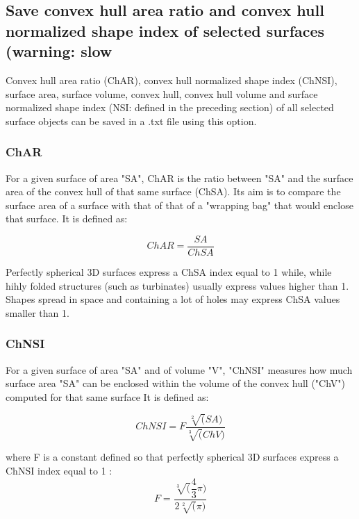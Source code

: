 \subsection{Save convex hull area ratio and convex hull normalized shape index of selected surfaces (warning: slow}
\noindent
Convex hull area ratio (ChAR), convex hull normalized shape index (ChNSI), surface area, surface volume, convex hull, convex hull volume and surface normalized shape index (NSI: defined in the preceding section) of all selected surface objects can be saved in a .txt file using this option.\\

\subsubsection{ChAR}

\noindent For a given surface of area "SA", ChAR is the ratio between "SA" and the surface area of the convex hull of that same surface (ChSA). Its aim is to compare the surface area of a surface with that of that of a "wrapping bag" that would enclose that surface. It is defined as: 


\begin{equation}
ChAR = \dfrac{SA}{ChSA}
\end{equation}

\noindent Perfectly spherical 3D surfaces express a ChSA index equal to 1 while, while hihly folded structures (such as turbinates)  usually express values higher than 1. Shapes spread in space and containing a lot of holes may express ChSA values smaller than 1.

\subsubsection{ChNSI}
\noindent For a given surface of area "SA" and of volume "V", "ChNSI" measures how much surface area "SA" can be enclosed within the volume of the convex hull ("ChV") computed for that same surface It is defined as: 

\begin{equation}
ChNSI = F \dfrac{\sqrt[2](SA)}{\sqrt[3](ChV)}
\end{equation}

\noindent where F is a constant defined so that perfectly spherical 3D surfaces express a ChNSI index equal to 1 :
\begin{equation}
F = \dfrac{\sqrt[3](\dfrac{4}{3}\pi)}{2\sqrt[2](\pi)}
\end{equation}

